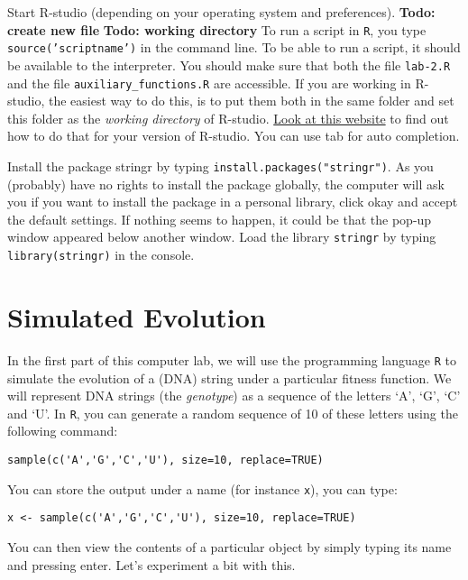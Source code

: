 \documentclass[a4paper, 9pt]{article}
\begin{document}
\begin{exercise}
    \action Start R-studio (depending on your operating system and preferences).
     \action\textbf{Todo: create new file}
     \action 
     \textbf{Todo: working directory}
     To run a script in \texttt{R}, you type \texttt{source('scriptname')} in the command line. To be able to run a script, it should be available to the interpreter. You should make sure that both the file \texttt{lab-2.R} and the file \texttt{auxiliary\_functions.R} are accessible. If you are working in R-studio, the easiest way to do this, is to put them both in the same folder and set this folder as the \textit{working directory} of R-studio. \href{https://support.rstudio.com/hc/en-us/articles/200711843-Working-Directories-and-Workspaces}{Look at this website} to find out how to do that for your version of R-studio. You can use tab for auto completion.

    \action Install the package stringr by typing \verb|install.packages("stringr")|. As you (probably) have no rights to install the package globally, the computer will ask you if you want to install the package in a personal library, click okay and accept the default settings. If nothing seems to happen, it could be that the pop-up window appeared below another window.
    \action Load the library \texttt{stringr} by typing \texttt{library(stringr)} in the console.
\end{exercise}


\section{Simulated Evolution}\label{simulated-evolution}

In the first part of this computer lab, we will use the programming
language \texttt{R} to simulate the evolution of a (DNA) string under a
particular fitness function. 
We will represent DNA strings (the \textit{genotype}) as a sequence of
the letters `A', `G', `C' and `U'. In \texttt{R}, you can generate a
random sequence of 10 of these letters using the following command:

\begin{lstlisting}
sample(c('A','G','C','U'), size=10, replace=TRUE)
\end{lstlisting}
You can store the output under a name (for instance \texttt{x}), you can
type:
\begin{lstlisting}
x <- sample(c('A','G','C','U'), size=10, replace=TRUE)
\end{lstlisting}
You can then view the contents of a particular object by simply typing
its name and pressing enter. Let's experiment a bit with this.
\end{document}
